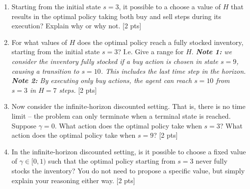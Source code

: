 \begin{enumerate}[label=(\alph*)]
    \item Starting from the initial state $s = 3$, it possible to a choose a value of $H$ that results in the optimal policy taking both buy and sell steps during its execution? Explain why or why not. [2 pts]

    \item For what values of $H$ does the optimal policy reach a fully stocked inventory, starting from the initial state $s = 3$? I.e. Give a range for $H$. \textit{\textbf{Note 1:} we consider the inventory fully stocked if a buy action is chosen in state $s = 9$, causing a transition to $s = 10$. This includes the last time step in the horizon.} \textit{\textbf{Note 2:} By executing only buy actions, the agent can reach $s = 10$ from $s = 3$ in $H = 7$ steps.} [2 pts]

    \item Now consider the infinite-horizon discounted setting. That is, there is no time limit -- the problem can only terminate when a terminal state is reached. Suppose $\gamma = 0$. What action does the optimal policy take when $s = 3$? What action does the optimal policy take when $s = 9$? [2 pts]

    \item In the infinite-horizon discounted setting, is it possible to choose a fixed value of $\gamma \in [0, 1)$ such that the optimal policy starting from $s = 3$ never fully stocks the inventory? You do not need to propose a specific value, but simply explain your reasoning either way. [2 pts]
\end{enumerate}


